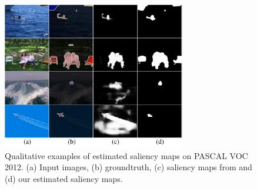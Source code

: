 \begin{figure}[t]
\centering
\includegraphics[width=8cm]{figures/fig_saliency_v2.pdf}
\caption{Qualitative examples of estimated saliency maps on PASCAL VOC 2012. (a) Input images, (b) groundtruth, (c) saliency maps from \cite{zhao2019pyramid} and (d) our estimated saliency maps.} \vspace{-2mm}
\label{fig:sal}
\end{figure}